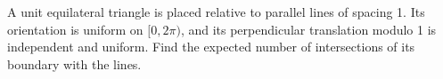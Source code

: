 A unit equilateral triangle is placed relative to parallel lines of spacing 1. Its orientation is uniform on $[0,2\pi)$, and its perpendicular translation modulo 1 is independent and uniform. Find the expected number of intersections of its boundary with the lines.
